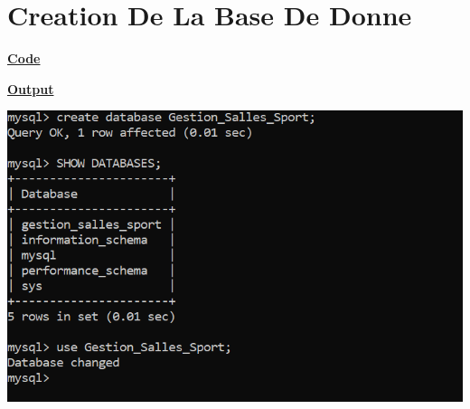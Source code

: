 \section{Creation De La Base De Donne}

\textbf{\underline{Code}}


\vspace{1cm}
\textbf{\underline{Output}}
\vspace{1cm}
\begin{center}
    \includegraphics[height=0.5\textheight]{Parties/Partie0/Capture.PNG}
\end{center}


